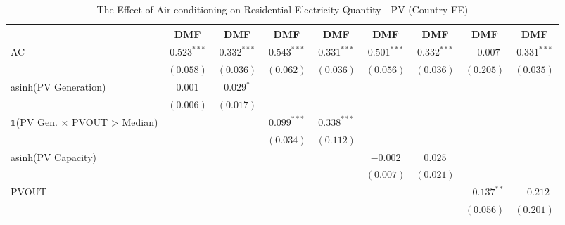
\begin{table}[htbp]
\caption{The Effect of Air-conditioning on Residential Electricity Quantity - PV (Country FE)}
\begin{center}
\begin{tabular}{l c c c c c c c c}
\hline
 & DMF & DMF & DMF & DMF & DMF & DMF & DMF & DMF \\
\hline
AC                                                        & $0.523^{***}$  & $0.332^{***}$  & $0.543^{***}$  & $0.331^{***}$  & $0.501^{***}$  & $0.332^{***}$  & $-0.007$       & $0.331^{***}$ \\
                                                          & $(0.058)$      & $(0.036)$      & $(0.062)$      & $(0.036)$      & $(0.056)$      & $(0.036)$      & $(0.205)$      & $(0.035)$     \\
asinh(PV Generation)                                      & $0.001$        & $0.029^{*}$    &                &                &                &                &                &               \\
                                                          & $(0.006)$      & $(0.017)$      &                &                &                &                &                &               \\
$\mathds{1}$(PV Gen. $\times$ PVOUT > Median)             &                &                & $0.099^{***}$  & $0.338^{***}$  &                &                &                &               \\
                                                          &                &                & $(0.034)$      & $(0.112)$      &                &                &                &               \\
asinh(PV Capacity)                                        &                &                &                &                & $-0.002$       & $0.025$        &                &               \\
                                                          &                &                &                &                & $(0.007)$      & $(0.021)$      &                &               \\
PVOUT                                                     &                &                &                &                &                &                & $-0.137^{**}$  & $-0.212$      \\
                                                          &                &                &                &                &                &                & $(0.056)$      & $(0.201)$     \\

\end{tabular}
\end{center}
\end{table}
